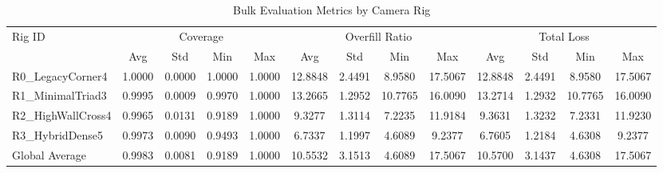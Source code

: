 \begin{table}[hbt!]
\centering
\caption{Bulk Evaluation Metrics by Camera Rig}
\begin{tabular}{|l|cccc|cccc|cccc|}
\hline
Rig ID & \multicolumn{4}{c|}{Coverage} & \multicolumn{4}{c|}{Overfill Ratio} & \multicolumn{4}{c|}{Total Loss} \\
\cline{2-13}
 & Avg & Std & Min & Max & Avg & Std & Min & Max & Avg & Std & Min & Max \\
\hline
R0\_LegacyCorner4 & 1.0000 & 0.0000 & 1.0000 & 1.0000 & 12.8848 & 2.4491 & 8.9580 & 17.5067 & 12.8848 & 2.4491 & 8.9580 & 17.5067 \\
R1\_MinimalTriad3 & 0.9995 & 0.0009 & 0.9970 & 1.0000 & 13.2665 & 1.2952 & 10.7765 & 16.0090 & 13.2714 & 1.2932 & 10.7765 & 16.0090 \\
R2\_HighWallCross4 & 0.9965 & 0.0131 & 0.9189 & 1.0000 & 9.3277 & 1.3114 & 7.2235 & 11.9184 & 9.3631 & 1.3232 & 7.2331 & 11.9230 \\
R3\_HybridDense5 & 0.9973 & 0.0090 & 0.9493 & 1.0000 & 6.7337 & 1.1997 & 4.6089 & 9.2377 & 6.7605 & 1.2184 & 4.6308 & 9.2377 \\
\hline
Global Average & 0.9983 & 0.0081 & 0.9189 & 1.0000 & 10.5532 & 3.1513 & 4.6089 & 17.5067 & 10.5700 & 3.1437 & 4.6308 & 17.5067 \\
\hline
\end{tabular}
\end{table}
